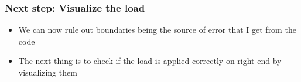 \documentclass{beamer}
\begin{document}
 \begin{frame}
\frametitle{Next step: Visualize the load}
\begin{itemize}
		\vfill
		\item{We can now rule out boundaries being the source of error that I get from the code}
		\vfill
		\item{The next thing is to check if the load is applied correctly on right end by visualizing them}
		\vfill
\end{itemize}
\end{frame}
\end{document}
